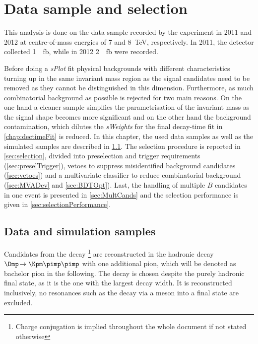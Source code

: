 \chapter{Data sample and selection}
\label{chap:selection}

\linespread{1.08}\selectfont
This analysis is done on the data sample recorded by the \lhcb experiment in \num{2011} and \num{2012} at centre-of-mass energies of \num{7} and \SI{8}{\tera\electronvolt}, respectively.
In \num{2011}, the detector collected \SI{1}{\per\femto\barn}, while in \num{2012} \SI{2}{\per\femto\barn} were recorded.

Before doing a \emph{sPlot} fit physical backgrounds with different \CP characteristics turning up in the same invariant mass region as the signal \BdToDpi candidates need to be removed as they cannot be distinguished in this dimension.
Furthermore, as much combinatorial background as possible is rejected for two main reasons.
On the one hand a cleaner sample simplfies the parametrisation of the invariant mass as the signal shape becomes more significant and on the other hand the background contamination, which dilutes the \emph{sWeights} for the final decay-time fit in \cref{chap:dectimeFit} is reduced.
In this chapter, the used data samples as well as the simulated samples are described in \cref{sec:Samples}.
The selection procedure is reported in \cref{sec:selection}, divided into preselection and trigger requirements (\cref{sec:preselTrigger}), vetoes to suppress \eg misidentified background candidates (\cref{sec:vetoes}) and a multivariate classifier to reduce combinatorial background (\cref{sec:MVADev} and \cref{sec:BDTOpt}).
Last, the handling of multiple $B$ candidates in one event is presented in \cref{sec:MultCands} and the selection performance is given in \cref{sec:selectionPerformance}.

\section{Data and simulation samples}
\label{sec:Samples}

Candidates from the decay \BdToDpi\footnote{Charge conjugation is implied throughout the whole document if not stated otherwise} are reconstructed in the hadronic decay $\Dmp\!\to\Kpm\pimp\pimp$ with one additional pion, which will be denoted as bachelor pion in the following.
The \D decay is chosen despite the purely hadronic final state, as it is the one with the largest decay width.
It is reconstructed inclusively, \ie no resonances such as the decay via a \Kstarz meson into a \kaon\pion final state are excluded.

